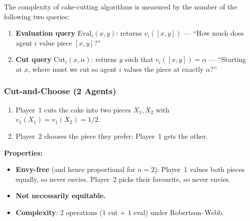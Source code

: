 \begin{defbox}
The complexity of cake-cutting algorithms is measured by the number of the following two queries:
\begin{enumerate}
  \item \textbf{Evaluation query} $\mathrm{Eval}_i(x, y)$: returns $v_i([x, y])$ --- ``How much does agent $i$ value piece $[x,y]$?''
  \item \textbf{Cut query} $\mathrm{Cut}_i(x, \alpha)$: returns $y$ such that $v_i([x, y]) = \alpha$ --- ``Starting at $x$, where must we cut so agent $i$ values the piece at exactly $\alpha$?''
\end{enumerate}
\end{defbox}

\separator

\subsubsection{Cut-and-Choose (2 Agents)}

\begin{thmbox}
\begin{enumerate}
  \item Player~1 cuts the cake into two pieces $X_1, X_2$ with $v_1(X_1) = v_1(X_2) = 1/2$.
  \item Player~2 chooses the piece they prefer; Player~1 gets the other.
\end{enumerate}
\textbf{Properties:}
\begin{itemize}
  \item \textbf{Envy-free} (and hence proportional for $n=2$): Player~1 values both pieces equally, so never envies. Player~2 picks their favourite, so never envies.
  \item \textbf{Not necessarily equitable.}
  \item \textbf{Complexity}: 2 operations (1 cut + 1 eval) under Robertson--Webb.
\end{itemize}
\end{thmbox}

